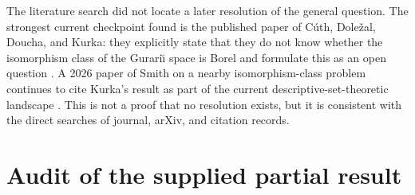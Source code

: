 \documentclass[11pt]{article}
\theoremstyle{definition}
\begin{document}
The literature search did not locate a later resolution of the general
question.  The strongest current checkpoint found is the published paper of
Cúth, Doležal, Doucha, and Kurka: they explicitly state that they do not know
whether the isomorphism class of the Gurari\u\i{} space is Borel and formulate
this as an open question \cite[Question 2]{CDDK}.  A 2026 paper of Smith on a
nearby isomorphism-class problem continues to cite Kurka's result as part of
the current descriptive-set-theoretic landscape \cite{Smith2026}.  This is
not a proof that no resolution exists, but it is consistent with the direct
searches of journal, arXiv, and citation records.

\medskip
\noindent{}

\section{Audit of the supplied partial result}
\end{document}
